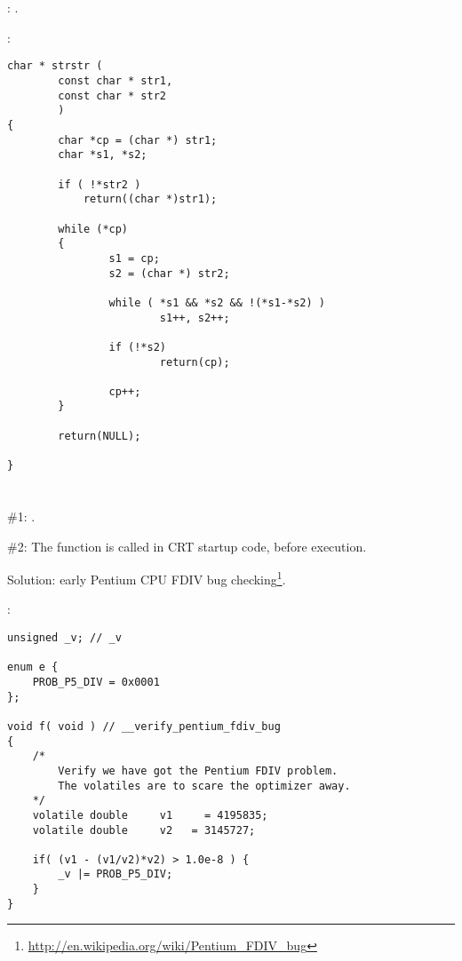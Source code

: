 \section{}

: .

:

\begin{lstlisting}
char * strstr (
        const char * str1,
        const char * str2
        )
{
        char *cp = (char *) str1;
        char *s1, *s2;

        if ( !*str2 )
            return((char *)str1);

        while (*cp)
        {
                s1 = cp;
                s2 = (char *) str2;

                while ( *s1 && *s2 && !(*s1-*s2) )
                        s1++, s2++;

                if (!*s2)
                        return(cp);

                cp++;
        }

        return(NULL);

}
\end{lstlisting}

\section{}

 \#1:  
\EMDASH{}.

 \#2: 
{The function is called in \ac{CRT} startup code, before \main execution}.

{Solution: early Pentium CPU FDIV bug checking}\footnote{\url{http://en.wikipedia.org/wiki/Pentium_FDIV_bug}}.

:

\begin{lstlisting}
unsigned _v; // _v

enum e {
    PROB_P5_DIV = 0x0001
};

void f( void ) // __verify_pentium_fdiv_bug
{
    /*
        Verify we have got the Pentium FDIV problem.
        The volatiles are to scare the optimizer away.
    */
    volatile double     v1     = 4195835;
    volatile double     v2   = 3145727;

    if( (v1 - (v1/v2)*v2) > 1.0e-8 ) {
        _v |= PROB_P5_DIV;
    }
}
\end{lstlisting}

